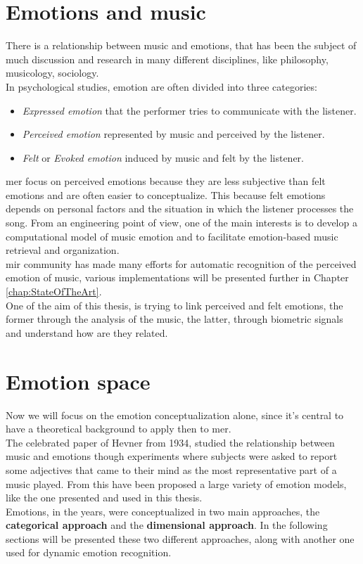 \newpage
\section{Emotions and music}
There is a relationship between music and emotions, that has been the subject of much discussion and research in many different disciplines, like philosophy, musicology, sociology.
\\
In psychological studies, emotion are often divided into three categories:
\begin{itemize}
	\item \textit{Expressed emotion} that the performer tries to communicate with the listener.
	\item \textit{Perceived emotion} represented by music and perceived by the listener.
	\item \textit{Felt} or \textit{Evoked emotion} induced by music and felt by the listener.
\end{itemize}
\gls{mer} focus on perceived emotions because they are less subjective than felt emotions and are often easier to conceptualize. This because felt emotions depends on personal factors and the situation in which the listener processes the song.
From an engineering point of view, one of the main interests is to develop a computational model of music emotion and to facilitate emotion-based music retrieval and organization.
\\
\gls{mir} community has made many efforts for automatic recognition of the perceived emotion of music, various implementations will be presented further in Chapter \ref{chap:StateOfTheArt}.
\\ \indent
One of the aim of this thesis, is trying to link perceived and felt emotions, the former through the analysis of the music, the latter, through biometric signals and understand how are they related.

\section{Emotion space}
Now we will focus on the emotion conceptualization alone, since it's central to have a theoretical background to apply then to \gls{mer}.
\\ \indent
The celebrated paper of Hevner \cite{hevner1935expression} from 1934, studied the relationship between music and emotions though experiments where subjects were asked to report some adjectives that came to their mind as the most representative part of a music played. From this have been proposed a large variety of emotion models, like the one presented and used in this thesis.
\\ \indent
Emotions, in the years, were conceptualized in two main approaches, the \textbf{categorical approach} and the \textbf{dimensional approach}. In the following sections will be presented these two different approaches, along with another one used for dynamic emotion recognition.

